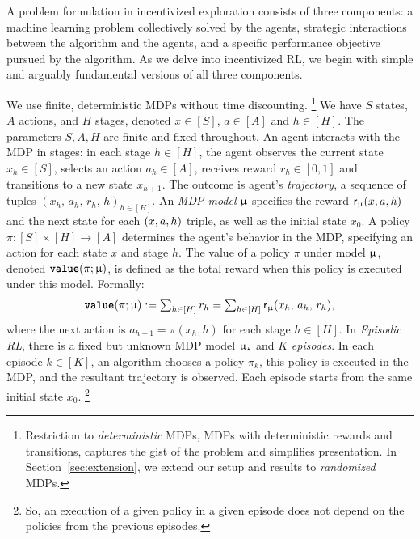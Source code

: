 
A problem formulation in incentivized exploration consists of three components: a machine learning problem collectively solved by the agents, strategic interactions between the algorithm and the agents, and a specific performance objective pursued by the algorithm.  As we delve into incentivized RL, we begin with simple and arguably fundamental versions of all three components.

We use finite, deterministic MDPs without time discounting.%
\footnote{Restriction to \emph{deterministic} MDPs, \ie MDPs with deterministic rewards and transitions, captures the gist of the problem and simplifies presentation. In Section~\ref{sec:extension}, we extend our setup and results to \emph{randomized} MDPs. }
We have $S$ states, $A$ actions, and $H$ stages, denoted $x\in[S]$, $a\in[A]$ and $h\in[H]$. The parameters $S,A,H$ are finite and fixed throughout. An agent interacts with the MDP in stages: in each stage $h\in[H]$, the agent observes the current state $x_h \in [S]$, selects an action $a_h\in [A]$, receives reward $r_h\in[0,1]$ and transitions to a new state $x_{h+1}$. The outcome is agent's \emph{trajectory}, a sequence of tuples
    $(x_h,\,a_h,\, r_h,\,h)_{h\in[H]}$.
An \emph{MDP model} $\upmu$ specifies the reward
    $\mathsf{r}_{\upmu}(x,a,h)$
and the next state for each $(x,a,h)$ triple, as well as the initial state $x_0$. A policy $\pi:[S]\times[H]\to [A]$ determines the agent's behavior in the MDP, specifying an action for each state $x$ and stage $h$. The value of a policy $\pi$ under model $\upmu$, denoted ${\normalfont \texttt{\textbf{value}}}(\pi;\upmu)$, is defined as the total reward when this policy is executed under this model. Formally:
\begin{align*}
{\normalfont \texttt{\textbf{value}}}(\pi;\upmu)
    := \textstyle \sum_{h\in[H]} r_h
    = \sum_{h\in[H]} \mathsf{r}_{\upmu}(x_h,\,a_h,\, r_h),
\end{align*}
where the next action is $a_{h+1} = \pi(x_h, h)$ for each stage $h\in [H]$. In \emph{Episodic RL}, there is a fixed but unknown MDP model $\upmu_{\star}$ and $K$ \emph{episodes}. In each episode $k\in [K]$, an algorithm chooses a policy $\pi_k$, this policy is executed in the MDP, and the resultant trajectory is observed. Each episode starts from the same initial state $x_0$.
\footnote{So, an execution of a given policy in a given episode does not depend on the policies from the previous episodes.}

